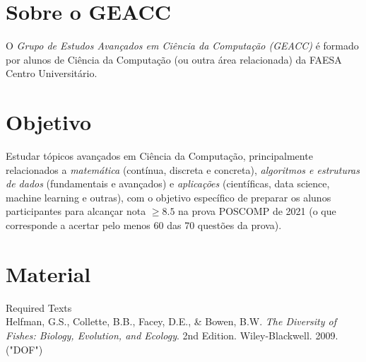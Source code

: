 \documentclass[a4paper]{inzane_syllabus} %
\begin{document}

\makeprofile 


\section{Sobre o GEACC}

O \emph{Grupo de Estudos Avançados em Ciência da Computação (GEACC)} é
formado por alunos de Ciência da Computação (ou outra área relacionada) da
FAESA Centro Universitário.

\vspace{0.5cm} 
\section{Objetivo}

Estudar tópicos avançados em Ciência da Computação, principalmente relacionados
a \emph{matemática} (contínua, discreta e concreta), \emph{algoritmos e
estruturas de dados} (fundamentais e avançados) e \emph{aplicações} (científicas,
data science, machine learning e outras), com o objetivo específico de preparar
os alunos participantes para alcançar nota $\ge 8.5$ na prova POSCOMP de 2021 (o
que corresponde a acertar pelo menos 60 das 70 questões da prova).




\vspace{0.5cm} 
\section{Material}

{\color{myCOLOR} Required Texts}\\
Helfman, G.S., Collette, B.B., Facey, D.E., \& Bowen, B.W. \textit{The Diversity
  of Fishes: Biology, Evolution, and Ecology}. 2nd Edition. Wiley-Blackwell. 2009.
("DOF") \\
\end{document}
